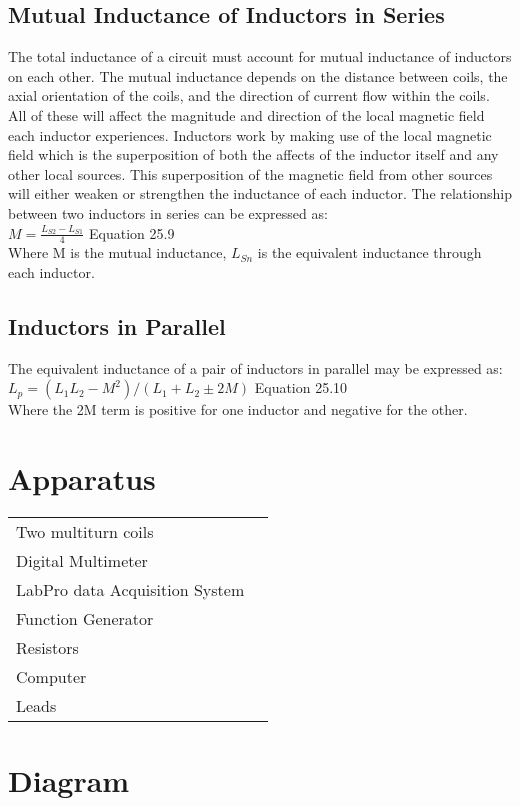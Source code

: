 \documentclass{article}
\begin{document}
\subsection{Mutual Inductance of Inductors in Series}
The total inductance of a circuit must account for mutual inductance of inductors on each other. The mutual inductance depends on the distance between coils, the axial orientation of the coils, and the direction of current flow within the coils. All of these will affect the magnitude and direction of the local magnetic field each inductor experiences. Inductors work by making use of the local magnetic field which is the superposition of both the affects of the inductor itself and any other local sources. This superposition of the magnetic field from other sources will either weaken or strengthen the inductance of each inductor. The relationship between two inductors in series can be expressed as:\\

$M=\frac{L_{S2}-L_{S1}}{4}$ Equation 25.9\\

Where M is the mutual inductance, $L_{Sn}$ is the equivalent inductance through each inductor.

\subsection{Inductors in Parallel}
The equivalent inductance of a pair of inductors in parallel may be expressed as:\\

$L_p=(L_1L_2-M^2)/(L_1+L_2\pm2M)$ Equation 25.10\\

Where the 2M term is positive for one inductor and negative for the other. 
\section{Apparatus}
\begin{tabular}{ll}
Two multiturn coils\\
Digital Multimeter\\
LabPro data Acquisition System\\
Function Generator\\
Resistors\\
Computer\\
Leads\\
\end{tabular}

\section{Diagram}
\end{document}
